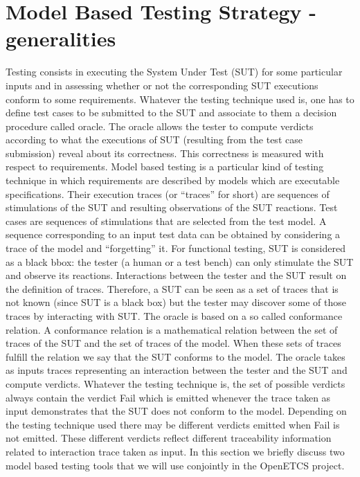 \section{Model Based Testing Strategy - generalities}
Testing consists in executing the System Under Test (SUT) for some
particular inputs and in assessing whether or not the corresponding
SUT executions conform to some requirements.  Whatever the testing
technique used is, one has to define test cases to be submitted to the
SUT and associate to them a decision procedure called oracle. The
oracle allows the tester to compute verdicts according to what the
executions of SUT (resulting from the test case submission) reveal
about its correctness.  This correctness is measured with respect to
requirements. Model based testing is a particular kind of testing
technique in which requirements are described by models which are
executable specifications. Their execution traces (or ``traces'' for
short) are sequences of stimulations of the SUT and resulting
observations of the SUT reactions. Test cases are sequences of
stimulations that are selected from the test model. A sequence
corresponding to an input test data can be obtained by considering a
trace of the model and ``forgetting'' it. For functional testing, SUT
is considered as a black bbox: the tester (a human or a test bench)
can only stimulate the SUT and observe its reactions. Interactions
between the tester and the SUT result on the definition of
traces. Therefore, a SUT can be seen as a set of traces that is not
known (since SUT is a black box) but the tester may discover some of
those traces by interacting with SUT. The oracle is based on a so
called conformance relation. A conformance relation is a mathematical
relation between the set of traces of the SUT and the set of traces of
the model.  When these sets of traces fulfill the relation we say that
the SUT conforms to the model. The oracle takes as inputs traces
representing an interaction between the tester and the SUT and compute
verdicts. Whatever the testing technique is, the set of possible
verdicts always contain the verdict Fail which is emitted whenever the
trace taken as input demonstrates that the SUT does not conform to the
model. Depending on the testing technique used there may be different
verdicts emitted when Fail is not emitted. These different verdicts
reflect different traceability information related to interaction
trace taken as input. In this section we briefly discuss two model
based testing tools that we will use conjointly in the OpenETCS
project.


